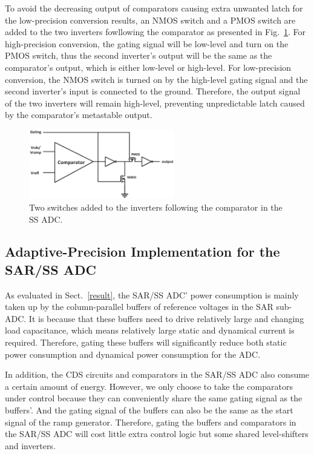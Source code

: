 To avoid the decreasing output of comparators causing extra unwanted latch for the low-precision conversion results, an NMOS switch and a PMOS switch are added to the two inverters fowllowing the comparator as presented in Fig.~\ref{MATE}. 
For high-precision conversion, the gating signal will be low-level and turn on the PMOS switch, thus the second inverter's output will be the same as the comparator's output, which is either low-level or high-level. 
For low-precision conversion, the NMOS switch is turned on by the high-level gating signal and the second inverter's input is connected to the ground. Therefore, the output signal of the two inverters will remain high-level, preventing unpredictable latch caused by the comparator's metastable output.

\begin{figure}[htbp]
	\centerline{\includegraphics[width=2.5in]{./Figures/MATE.eps}}
	\caption{Two switches added to the inverters following the comparator in the SS ADC.}
	\label{MATE}
\end{figure} 

\subsection{Adaptive-Precision Implementation for the SAR/SS ADC}

As evaluated in Sect.~\ref{result}, the SAR/SS ADC’ power consumption is mainly taken up by the column-parallel buffers of reference voltages in the SAR sub-ADC.
It is because that these buffers need to drive relatively large and changing load capacitance, which means relatively large static and dynamical current is required.
Therefore, gating these buffers will significantly reduce both static power consumption and dynamical power consumption for the ADC.

In addition, the CDS circuits and comparators in the SAR/SS ADC also consume a certain amount of energy. However, we only choose to take the comparators under control because they can conveniently share the same gating signal as the buffers'. And the gating signal of the buffers can also be the same as the start signal of the ramp generator. Therefore, gating the buffers and comparators in the SAR/SS ADC will cost little extra control logic but some shared level-shifters and inverters.


